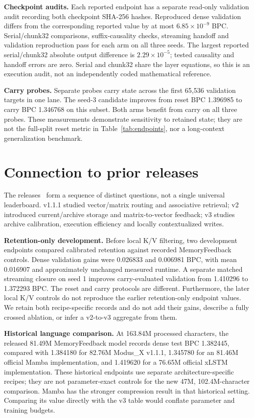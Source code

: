 \documentclass[10pt]{article}
\newcommand{\mx}{Modus\_X}
\begin{document}
\textbf{Checkpoint audits.} Each reported endpoint has a separate read-only
validation audit recording both checkpoint SHA-256 hashes. Reproduced dense
validation differs from the corresponding reported value by at most
$6.85\times10^{-9}$ BPC. Serial/chunk32 comparisons, suffix-causality checks,
streaming handoff and validation reproduction pass for each arm on all three
seeds. The largest reported serial/chunk32 absolute output difference is
$2.29\times10^{-5}$; tested causality and handoff errors are zero. Serial and
chunk32 share the layer equations, so this is an execution audit, not an
independently coded mathematical reference.

\textbf{Carry probes.} Separate probes carry state across the first 65,536
validation targets in one lane. The seed-3 candidate improves from reset BPC
1.396985 to carry BPC 1.346768 on this subset. Both arms benefit from carry on
all three probes. These measurements demonstrate sensitivity to retained state;
they are not the full-split reset metric in Table~\ref{tab:endpoints}, nor a
long-context generalization benchmark.

\section{Connection to prior releases}
\label{sec:history}
The releases~\cite{modus2026} form a sequence of distinct questions, not a single universal
leaderboard. v1.1.1 studied vector/matrix routing and associative retrieval;
v2 introduced current/archive storage and matrix-to-vector feedback; v3 studies
archive calibration, execution efficiency and locally contextualized writes.

\textbf{Retention-only development.} Before local K/V filtering, two development
endpoints compared calibrated retention against recorded MemoryFeedback controls.
Dense validation gains were 0.026833 and 0.006981 BPC, with mean 0.016907 and
approximately unchanged measured runtime. A separate matched streaming closure
on seed 1 improves carry-evaluated validation from 1.410296 to 1.372293 BPC.
The reset and carry protocols are different. Furthermore, the later local K/V
controls do not reproduce the earlier retention-only endpoint values. We retain
both recipe-specific records and do not add their gains, describe a fully crossed
ablation, or infer a v2-to-v3 aggregate from them.

\textbf{Historical language comparison.} At 163.84M processed characters, the
released 81.49M MemoryFeedback model records dense test BPC 1.382445, compared
with 1.384180 for 82.76M \mx{} v1.1.1, 1.345780 for an 81.46M official Mamba
implementation, and 1.419620 for a 76.65M official xLSTM implementation.
These historical endpoints use separate architecture-specific recipes; they
are not parameter-exact controls for the new 47M, 102.4M-character comparison.
Mamba has the stronger compression result in that historical setting. Comparing
its value directly with the v3 table would conflate parameter and training budgets.
\end{document}
